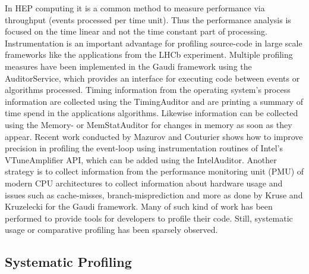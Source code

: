 \documentclass[a4paper]{jpconf}
\begin{document}
In HEP computing it is a common method to measure performance via throughput (events processed per time unit). Thus the performance analysis is focused on the time linear and not the time constant part of processing. Instrumentation is an important advantage for profiling source-code in large scale frameworks like the applications from the LHCb experiment. Multiple profiling measures have been implemented in the Gaudi framework using the AuditorService, which provides an interface for executing code between events or algorithms processed.
\newline
Timing information from the operating system's process information are collected using the TimingAuditor and are printing a summary of time spend in the applications algorithms. Likewise information can be collected using the Memory- or MemStatAuditor for changes in memory as soon as they appear. Recent work \cite{intel_auditor} conducted by Mazurov and Couturier shows how to improve precision in profiling the event-loop using instrumentation routines of Intel's VTune\texttrademark Amplifier API, which can be added using the IntelAuditor. Another strategy is to collect information from the performance monitoring unit (PMU) of modern CPU architectures to collect information about hardware usage and issues such as cache-misses, branch-misprediction and more as done by Kruse and Kruzelecki \cite{modular_monitoring} for the Gaudi framework. Many of such kind of work has been performed to provide tools for developers to profile their code. Still, systematic usage or comparative profiling has been sparsely observed.

\subsection{Systematic Profiling}
\label{sec:integrated_profiling}
\end{document}
